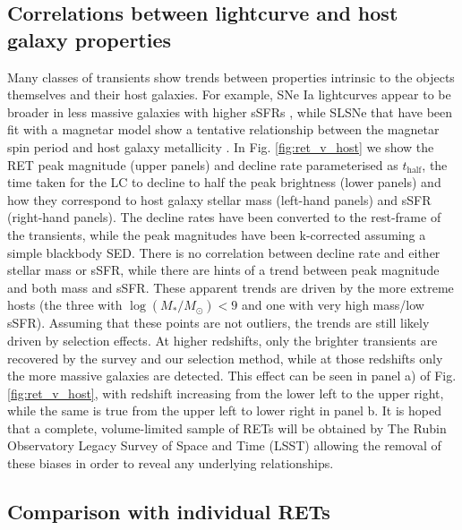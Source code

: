 \documentclass[fleqn,usenatbib,]{mnras}
\begin{document}
\subsection{Correlations between lightcurve and host galaxy properties \label{subsec:disc_correlations}}
Many classes of transients show trends between properties intrinsic to the objects themselves and their host galaxies. For example, SNe Ia lightcurves appear to be broader in less massive galaxies with higher sSFRs \citep{Sullivan2006,Neill2009,Howell2009,Sullivan2010,Roman2018,Kelsey2020}, while SLSNe that have been fit with a magnetar model show a tentative relationship between the magnetar spin period and host galaxy metallicity \citep{Chen2016a}. In Fig. \ref{fig:ret_v_host} we show the RET peak magnitude (upper panels) and decline rate parameterised as $t_{\mathrm{half}}$, the time taken for the LC to decline to half the peak brightness (lower panels) and how they correspond to host galaxy stellar mass (left-hand panels) and sSFR (right-hand panels). The decline rates have been converted to the rest-frame of the transients, while the peak magnitudes have been k-corrected assuming a simple blackbody SED. There is no correlation between decline rate and either stellar mass or sSFR, while there are hints of a trend between peak magnitude and both mass and sSFR. These apparent trends are driven by the more extreme hosts (the three with $\log\left(M_*/M_{\odot}\right) < 9$ and one with very high mass/low sSFR). Assuming that these points are not outliers, the trends are still likely driven by selection effects. At higher redshifts, only the brighter transients are recovered by the survey and our selection method, while at those redshifts only the more massive galaxies are detected. This effect can be seen in panel a) of Fig. \ref{fig:ret_v_host}, with redshift increasing from the lower left to the upper right, while the same is true from the upper left to lower right in panel b. It is hoped that a complete, volume-limited sample of RETs will be obtained by The Rubin Observatory Legacy Survey of Space and Time (LSST) allowing the removal of these biases in order to reveal any underlying relationships.

\subsection{Comparison with individual RETs \label{subsec:disc_lowz}}
\end{document}
